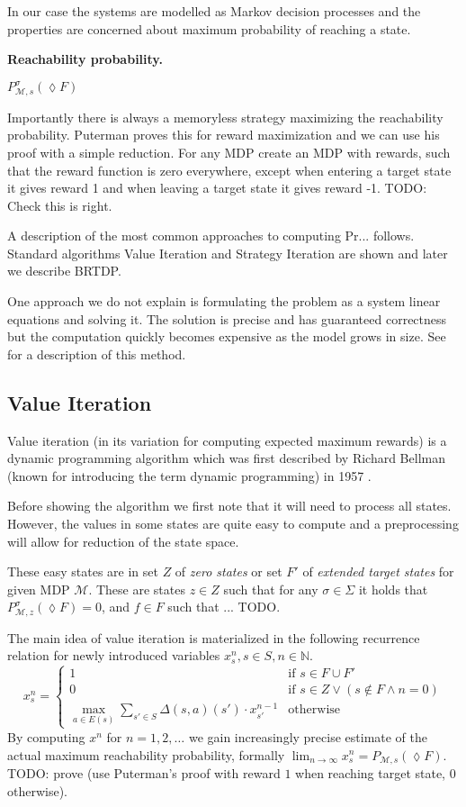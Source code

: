 In our case the systems are modelled as Markov decision processes and
the properties are concerned about maximum probability of reaching a state.

\noindent \textbf{Reachability probability.}

$P^\sigma_{\mathcal{M},s}(\lozenge F)$

Importantly there is always a memoryless strategy maximizing the
reachability probability. Puterman \parencite{puterman} proves this for
reward maximization and we can use his proof with a simple reduction.
For any MDP create an MDP with rewards, such that the reward function
is zero everywhere, except when entering a target state it gives reward 1
and when leaving a target state it gives reward -1. TODO: Check this is
right.

A description of the most common approaches to computing Pr... follows.
Standard algorithms Value Iteration and Strategy Iteration are shown
and later we describe BRTDP.

One approach we do not explain is formulating the problem as a system
linear equations and solving it. The solution is precise and has
guaranteed correctness but the computation quickly becomes expensive as
the model grows in size.  See \parencite{forejt} for a description of
this method.

\subsection{Value Iteration}

Value iteration (in its variation for computing expected maximum rewards) is a
dynamic programming algorithm which was first described by Richard
Bellman (known for introducing the term dynamic programming) in 1957
\parencite{bellman}.

Before showing the algorithm we first note that it will need to
process all states. However, the values in some states are quite easy to
compute and a preprocessing will allow for reduction of the
state space.

These easy states are in set $Z$
of {\em zero states} or set $F'$ of {\em extended target states}
for given MDP $\mathcal{M}$. These are states $z
\in Z$ such that for any $\sigma \in \Sigma$ it holds that
$P^\sigma_{\mathcal{M},z}(\lozenge F) = 0$,
and $f \in F$ such that ... TODO.

The main idea of value iteration is materialized in the following
recurrence relation for newly introduced variables $x_s^n, s \in S, n
\in \mathbb{N}$.
\[
x_s^n =
\begin{cases}
    1 & \text{if }s \in F \cup F' \\
    0 & \text{if }s \in Z \lor (s \not \in F \land n = 0) \\
    \max\limits_{a \in E(s)} \sum\limits_{s' \in S} \Delta(s,a)(s') \cdot x_{s'}^{n-1}
    & \text{otherwise} %
\end{cases}
\]
By computing $x^n$ for $n = 1,2,\ldots$ we gain increasingly precise
estimate of the actual maximum reachability probability,
formally $\lim_{n \to \infty} x^n_s = P_{\mathcal{M},s}(\lozenge F)$.
TODO: prove (use Puterman's proof with reward $1$ when reaching target
state, 0 otherwise).

